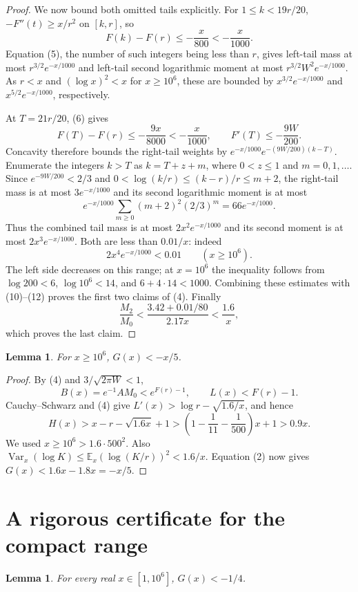 \documentclass[10pt]{article}
\newtheorem{lemma}[theorem]{Lemma}
\newcommand{\E}{\mathbb E}
\newcommand{\Var}{\operatorname{Var}}
\begin{document}
\begin{proof}
We now bound both omitted tails explicitly. For $1\le k<19r/20$,
$-F''(t)\ge x/r^2$ on $[k,r]$, so
\[
 F(k)-F(r)\le-\frac{x}{800}<-\frac{x}{1000}.
\]
Equation (5), the number of such integers being less than $r$, gives
left-tail mass at most $r^{3/2}e^{-x/1000}$ and left-tail second
logarithmic moment at most $r^{3/2}W^2e^{-x/1000}$.
As $r<x$ and $(\log x)^2<x$ for $x\ge10^6$, these are bounded by
$x^{3/2}e^{-x/1000}$ and $x^{5/2}e^{-x/1000}$, respectively.

At $T=21r/20$, (6) gives
\[
 F(T)-F(r)\le-\frac{9x}{8000}<-\frac{x}{1000},
 \qquad F'(T)\le-\frac{9W}{200}.
\]
Concavity therefore bounds the right-tail weights by
$e^{-x/1000}e^{-(9W/200)(k-T)}$. Enumerate the integers $k>T$
as $k=T+z+m$, where $0<z\le1$ and $m=0,1,\ldots$.
Since $e^{-9W/200}<2/3$ and
$0<\log(k/r)\le(k-r)/r\le m+2$, the right-tail mass is at most
$3e^{-x/1000}$ and its second logarithmic moment is at most
\[
 e^{-x/1000}\sum_{m\ge0}(m+2)^2(2/3)^m
       =66e^{-x/1000}.
\]
Thus the combined tail mass is at most $2x^2e^{-x/1000}$ and its
second moment is at most $2x^3e^{-x/1000}$. Both are less than
$0.01/x$: indeed
\[
 2x^4e^{-x/1000}<0.01\qquad(x\ge10^6).                 \tag{13}
\]
The left side decreases on this range; at $x=10^6$ the inequality
follows from $\log200<6$, $\log10^6<14$, and $6+4\cdot14<1000$.
Combining these estimates with (10)--(12) proves the first two
claims of (4). Finally
\[
 \frac{M_2}{M_0}
 <\frac{3.42+0.01/80}{2.17x}<\frac{1.6}{x},
\]
which proves the last claim.
\end{proof}

\begin{lemma}\label{large}
For $x\ge10^6$, $G(x)<-x/5$.
\end{lemma}
\begin{proof}
By (4) and $3/\sqrt{2\pi W}<1$,
\[
 B(x)=e^{-1}A M_0<e^{F(r)-1},\qquad L(x)<F(r)-1.
\]
Cauchy--Schwarz and (4) give
$L'(x)>\log r-\sqrt{1.6/x}$, and hence
\[
 H(x)>x-r-\sqrt{1.6x}+1
 >\left(1-\frac1{11}-\frac1{500}\right)x+1>0.9x.
\]
We used $x\ge10^6>1.6\cdot500^2$.
Also $\Var_x(\log K)\le\E_x(\log(K/r))^2<1.6/x$.
Equation (2) now gives $G(x)<1.6x-1.8x=-x/5$.
\end{proof}

\section{A rigorous certificate for the compact range}
\begin{lemma}\label{compact}
For every real $x\in[1,10^6]$, $G(x)<-1/4$.
\end{lemma}
\end{document}
